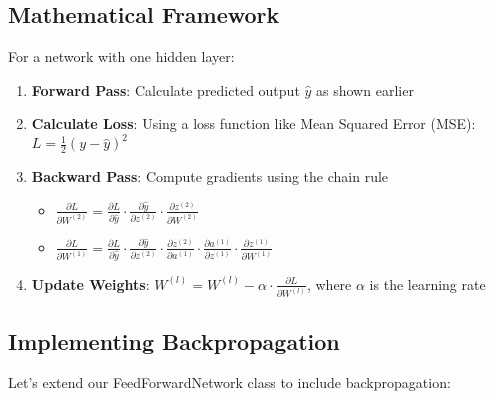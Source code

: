 \documentclass[
  letterpaper,
  DIV=11,
  numbers=noendperiod]{scrreprt}
\providecommand{\tightlist}{%
  \setlength{\itemsep}{0pt}\setlength{\parskip}{0pt}}\usepackage{longtable,booktabs,array}
\begin{document}
\subsection{Mathematical Framework}\label{mathematical-framework}

For a network with one hidden layer:

\begin{enumerate}
\def\labelenumi{\arabic{enumi}.}
\tightlist
\item
  \textbf{Forward Pass}: Calculate predicted output \(\hat{y}\) as shown
  earlier
\item
  \textbf{Calculate Loss}: Using a loss function like Mean Squared Error
  (MSE): \(L = \frac{1}{2}(y - \hat{y})^2\)
\item
  \textbf{Backward Pass}: Compute gradients using the chain rule

  \begin{itemize}
  \tightlist
  \item
    \(\frac{\partial L}{\partial W^{(2)}} = \frac{\partial L}{\partial \hat{y}} \cdot \frac{\partial \hat{y}}{\partial z^{(2)}} \cdot \frac{\partial z^{(2)}}{\partial W^{(2)}}\)
  \item
    \(\frac{\partial L}{\partial W^{(1)}} = \frac{\partial L}{\partial \hat{y}} \cdot \frac{\partial \hat{y}}{\partial z^{(2)}} \cdot \frac{\partial z^{(2)}}{\partial a^{(1)}} \cdot \frac{\partial a^{(1)}}{\partial z^{(1)}} \cdot \frac{\partial z^{(1)}}{\partial W^{(1)}}\)
  \end{itemize}
\item
  \textbf{Update Weights}:
  \(W^{(l)} = W^{(l)} - \alpha \cdot \frac{\partial L}{\partial W^{(l)}}\),
  where \(\alpha\) is the learning rate
\end{enumerate}

\subsection{Implementing
Backpropagation}\label{implementing-backpropagation}

Let's extend our FeedForwardNetwork class to include backpropagation:
\end{document}
